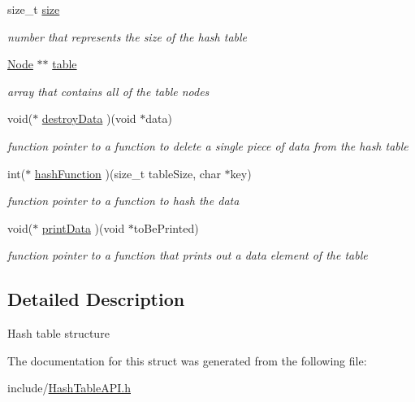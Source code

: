 \begin{DoxyCompactItemize}
\item 
\mbox{\label{structHTable_a6ede6f5f1f743298425e0832cfd24a4a}} 
size\+\_\+t \hyperlink{structHTable_a6ede6f5f1f743298425e0832cfd24a4a}{size}
\begin{DoxyCompactList}\small\item\em number that represents the size of the hash table \end{DoxyCompactList}\item 
\mbox{\label{structHTable_ad8f77b5519a173524eee87a5ebb380a0}} 
\hyperlink{structNode}{Node} $\ast$$\ast$ \hyperlink{structHTable_ad8f77b5519a173524eee87a5ebb380a0}{table}
\begin{DoxyCompactList}\small\item\em array that contains all of the table nodes \end{DoxyCompactList}\item 
\mbox{\label{structHTable_a05b3109f3bbfa3fd4b3e55c0bbd29b8a}} 
void($\ast$ \hyperlink{structHTable_a05b3109f3bbfa3fd4b3e55c0bbd29b8a}{destroy\+Data} )(void $\ast$data)
\begin{DoxyCompactList}\small\item\em function pointer to a function to delete a single piece of data from the hash table \end{DoxyCompactList}\item 
\mbox{\label{structHTable_a0e418d66d4114826c3f9905084e0b9c7}} 
int($\ast$ \hyperlink{structHTable_a0e418d66d4114826c3f9905084e0b9c7}{hash\+Function} )(size\+\_\+t table\+Size, char $\ast$key)
\begin{DoxyCompactList}\small\item\em function pointer to a function to hash the data \end{DoxyCompactList}\item 
\mbox{\label{structHTable_a573abbe70757c842d491ff15d827c002}} 
void($\ast$ \hyperlink{structHTable_a573abbe70757c842d491ff15d827c002}{print\+Data} )(void $\ast$to\+Be\+Printed)
\begin{DoxyCompactList}\small\item\em function pointer to a function that prints out a data element of the table \end{DoxyCompactList}\end{DoxyCompactItemize}


\subsection{Detailed Description}
Hash table structure 

The documentation for this struct was generated from the following file\+:\begin{DoxyCompactItemize}
\item 
include/\hyperlink{HashTableAPI_8h}{Hash\+Table\+A\+P\+I.\+h}\end{DoxyCompactItemize}
